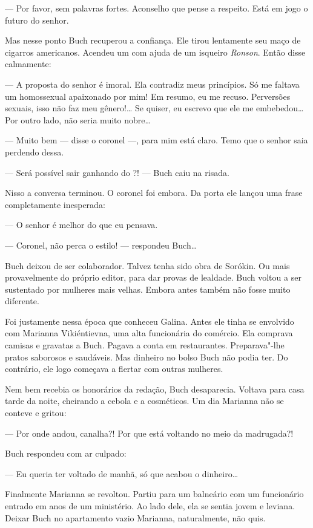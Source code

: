 --- Por favor, sem palavras fortes. Aconselho que pense a respeito. Está
em jogo o futuro do senhor.

Mas nesse ponto Buch recuperou a confiança. Ele tirou lentamente seu
maço de cigarros americanos. Acendeu um com ajuda de um isqueiro
\emph{Ronson}. Então disse calmamente:

--- A proposta do senhor é imoral. Ela contradiz meus princípios. Só me
faltava um homossexual apaixonado por mim! Em resumo, eu me recuso.
Perversões sexuais, isso não faz meu gênero!\ldots{} Se quiser, eu escrevo
que ele me embebedou\ldots{} Por outro lado, não seria muito nobre\ldots{}

--- Muito bem --- disse o coronel ---, para mim está claro. Temo que o
senhor saia perdendo dessa.

--- Será possível sair ganhando do ?! --- Buch caiu na risada.

Nisso a conversa terminou. O coronel foi embora. Da porta ele lançou uma
frase completamente inesperada:

--- O senhor é melhor do que eu pensava.

--- Coronel, não perca o estilo! --- respondeu Buch\ldots{}

Buch deixou de ser colaborador. Talvez tenha sido obra de Sorókin. Ou
mais provavelmente do próprio editor, para dar provas de lealdade. Buch
voltou a ser sustentado por mulheres mais velhas. Embora antes também
não fosse muito diferente.

Foi justamente nessa época que conheceu Galina. Antes ele tinha se
envolvido com Marianna Vikiéntievna, uma alta funcionária do comércio.
Ela comprava camisas e gravatas a Buch. Pagava a conta em restaurantes.
Preparava"-lhe pratos saborosos e saudáveis. Mas dinheiro no bolso Buch
não podia ter. Do contrário, ele logo começava a flertar com outras
mulheres.

Nem bem recebia os honorários da redação, Buch desaparecia. Voltava para
casa tarde da noite, cheirando a cebola e a cosméticos. Um dia Marianna
não se conteve e gritou:

--- Por onde andou, canalha?! Por que está voltando no meio da
madrugada?!

Buch respondeu com ar culpado:

--- Eu queria ter voltado de manhã, só que acabou o dinheiro\ldots{}

Finalmente Marianna se revoltou. Partiu para um balneário com um
funcionário entrado em anos de um ministério. Ao lado dele, ela se
sentia jovem e leviana. Deixar Buch no apartamento vazio Marianna,
naturalmente, não quis.

